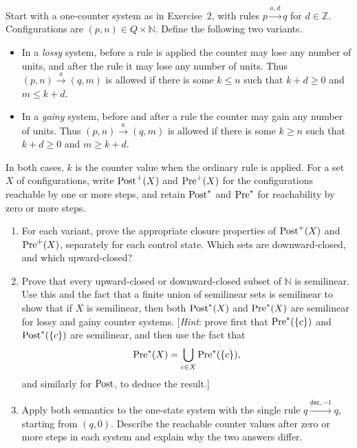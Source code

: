 \documentclass{tutorial}
\begin{document}
\begin{exercise}
Start with a one-counter system as in Exercise~2, with rules
$p\xrightarrow{a,d}q$ for $d\in\mathbb{Z}$. Configurations are
$(p,n)\in Q\times\mathbb{N}$. Define the following two variants.
\begin{itemize}
  \item In a \emph{lossy} system, before a rule is applied the counter may
        lose any number of units, and after the rule it may lose any number
        of units. Thus $(p,n)\xrightarrow{a}(q,m)$ is allowed if there is
        some $k\leq n$ such that $k+d\geq 0$ and $m\leq k+d$.
  \item In a \emph{gainy} system, before and after a rule the counter may
        gain any number of units. Thus $(p,n)\xrightarrow{a}(q,m)$ is
        allowed if there is some $k\geq n$ such that $k+d\geq 0$ and
        $m\geq k+d$.
\end{itemize}
In both cases, $k$ is the counter value when the ordinary rule is applied.
For a set $X$ of configurations, write $\operatorname{Post}^+(X)$ and
$\operatorname{Pre}^+(X)$ for the configurations reachable by one or more
steps, and retain $\operatorname{Post}^*$ and $\operatorname{Pre}^*$ for
reachability by zero or more steps.

\begin{enumerate}
  \item For each variant, prove the appropriate closure properties of
        $\operatorname{Post}^+(X)$ and $\operatorname{Pre}^+(X)$, separately
        for each control state. Which sets are downward-closed, and which
        upward-closed?
  \item Prove that every upward-closed or downward-closed subset of
        $\mathbb{N}$ is semilinear. Use this and the fact that a finite union
        of semilinear sets is semilinear to show that if $X$ is semilinear,
        then both $\operatorname{Post}^*(X)$ and $\operatorname{Pre}^*(X)$
        are semilinear for lossy and gainy counter systems.
        [\emph{Hint}: prove first that \(\operatorname{Pre}^\ast(\{c\})\) and \(\operatorname{Post}^\ast(\{c\})\)
        are semilinear, and then use the fact that
          \[ \operatorname{Pre}^\ast(X) = \bigcup_{c \in X} \operatorname{Pre}^\ast(\{c\}), \]
        and similarly for $\operatorname{Post}$, to deduce the result.]
    \item Apply both semantics to the one-state system with the single rule
        $q\xrightarrow{\mathsf{dec},-1}q$, starting from $(q,0)$. Describe
        the reachable counter values after zero or more steps in each
        system and explain why the two answers differ.
\end{enumerate}
\end{exercise}
\end{document}
